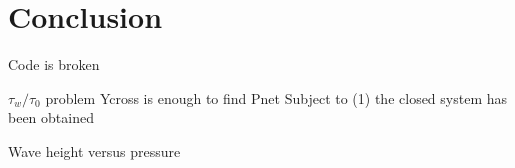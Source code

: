 \chapter{Conclusion}

Code is broken

$\tau_w/\tau_0$ problem
Ycross is enough to find Pnet
Subject to (1) the closed system has been obtained

Wave height versus pressure
